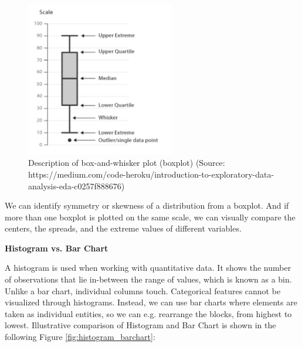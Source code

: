 \documentclass[a4paper,10pt,twoside]{article}
\begin{document}
\vspace{0.3cm}
\begin{figure}[hbt!]
\begin{center}
\includegraphics[width=6.5cm]{../pictures/boxplot.png}
\caption[Description of box-and-whisker plot (boxplot)]{Description of box-and-whisker plot (boxplot) (Source: https://medium.com/code-heroku/introduction-to-exploratory-data-analysis-eda-c0257f888676)}
\label{fig:boxplot}
\end{center}
\end{figure}

\noindent We can identify symmetry or skewness of a distribution from a boxplot. And if more than one boxplot is plotted on the same scale, we can visually compare the centers, the spreads, and the extreme values of different variables.

\bigskip
\noindent \textbf {Histogram vs. Bar Chart}

\noindent A histogram is used when working with quantitative data. It shows the number of observations that lie in-between the range of values, which is known as a bin. Unlike a bar chart, individual columns touch. Categorical features cannot be visualized through histograms. Instead, we can use bar charts where elements are taken as individual entities, so we can e.g. rearrange the blocks, from highest to lowest. Illustrative comparison of Histogram and Bar Chart is shown in the following Figure \ref{fig:histogram_barchart}:
\end{document}
